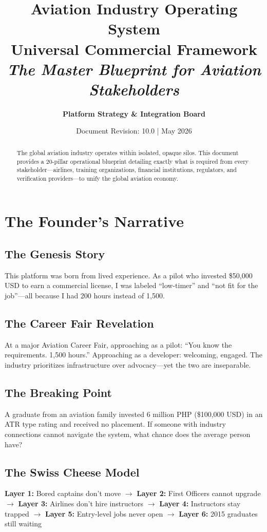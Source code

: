 \documentclass[11pt, a4paper]{article}
\title{
    \vspace{-2cm}
    \normalsize Aviation Industry Operating System \\
    \huge \textbf{Universal Commercial Framework} \\
    \vspace{0.5cm}
    \Large \textit{The Master Blueprint for Aviation Stakeholders}
}
\author{\textbf{Platform Strategy \& Integration Board}}
\date{Document Revision: 10.0 | May 2026}
\begin{document}
\maketitle
\thispagestyle{empty}

\begin{abstract}
\noindent \large The global aviation industry operates within isolated, opaque silos. This document provides a 20-pillar operational blueprint detailing exactly what is required from every stakeholder---airlines, training organizations, financial institutions, regulators, and verification providers---to unify the global aviation economy.
\end{abstract}

\newpage
\tableofcontents
\newpage

\section{The Founder's Narrative}

\subsection{The Genesis Story}
This platform was born from lived experience. As a pilot who invested \$50,000 USD to earn a commercial license, I was labeled ``low-timer'' and ``not fit for the job''---all because I had 200 hours instead of 1,500.

\subsection{The Career Fair Revelation}
At a major Aviation Career Fair, approaching as a pilot: ``You know the requirements. 1,500 hours.'' Approaching as a developer: welcoming, engaged. The industry prioritizes infrastructure over advocacy---yet the two are inseparable.

\subsection{The Breaking Point}
A graduate from an aviation family invested 6 million PHP (\$100,000 USD) in an ATR type rating and received no placement. If someone with industry connections cannot navigate the system, what chance does the average person have?

\subsection{The Swiss Cheese Model}
\begin{mdframed}[linecolor=prNavy, linewidth=1pt, backgroundcolor=prGray]
\textbf{Layer 1:} Bored captains don't move $\rightarrow$ \textbf{Layer 2:} First Officers cannot upgrade $\rightarrow$ \textbf{Layer 3:} Airlines don't hire instructors $\rightarrow$ \textbf{Layer 4:} Instructors stay trapped $\rightarrow$ \textbf{Layer 5:} Entry-level jobs never open $\rightarrow$ \textbf{Layer 6:} 2015 graduates still waiting
\end{mdframed}
\end{document}
